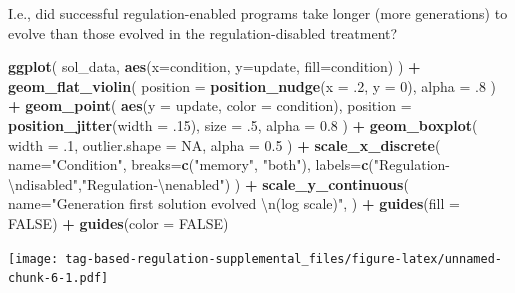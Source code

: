 \documentclass[
]{book}
\newenvironment{Shaded}{\begin{snugshade}}{\end{snugshade}}
\newcommand{\CharTok}[1]{\textcolor[rgb]{0.31,0.60,0.02}{#1}}
\newcommand{\DataTypeTok}[1]{\textcolor[rgb]{0.13,0.29,0.53}{#1}}
\newcommand{\DecValTok}[1]{\textcolor[rgb]{0.00,0.00,0.81}{#1}}
\newcommand{\FloatTok}[1]{\textcolor[rgb]{0.00,0.00,0.81}{#1}}
\newcommand{\KeywordTok}[1]{\textcolor[rgb]{0.13,0.29,0.53}{\textbf{#1}}}
\newcommand{\NormalTok}[1]{#1}
\newcommand{\OperatorTok}[1]{\textcolor[rgb]{0.81,0.36,0.00}{\textbf{#1}}}
\newcommand{\OtherTok}[1]{\textcolor[rgb]{0.56,0.35,0.01}{#1}}
\newcommand{\StringTok}[1]{\textcolor[rgb]{0.31,0.60,0.02}{#1}}
\begin{document}
I.e., did successful regulation-enabled programs take longer (more generations) to evolve than those evolved in the regulation-disabled treatment?

\begin{Shaded}
\begin{Highlighting}[]
\KeywordTok{ggplot}\NormalTok{( sol\_data, }\KeywordTok{aes}\NormalTok{(}\DataTypeTok{x=}\NormalTok{condition, }\DataTypeTok{y=}\NormalTok{update, }\DataTypeTok{fill=}\NormalTok{condition) ) }\OperatorTok{+}
\StringTok{  }\KeywordTok{geom\_flat\_violin}\NormalTok{(}
    \DataTypeTok{position =} \KeywordTok{position\_nudge}\NormalTok{(}\DataTypeTok{x =} \FloatTok{.2}\NormalTok{, }\DataTypeTok{y =} \DecValTok{0}\NormalTok{),}
    \DataTypeTok{alpha =} \FloatTok{.8}
\NormalTok{  ) }\OperatorTok{+}
\StringTok{  }\KeywordTok{geom\_point}\NormalTok{(}
    \KeywordTok{aes}\NormalTok{(}\DataTypeTok{y =}\NormalTok{ update, }\DataTypeTok{color =}\NormalTok{ condition),}
    \DataTypeTok{position =} \KeywordTok{position\_jitter}\NormalTok{(}\DataTypeTok{width =} \FloatTok{.15}\NormalTok{),}
    \DataTypeTok{size =} \FloatTok{.5}\NormalTok{,}
    \DataTypeTok{alpha =} \FloatTok{0.8}
\NormalTok{  ) }\OperatorTok{+}
\StringTok{  }\KeywordTok{geom\_boxplot}\NormalTok{(}
    \DataTypeTok{width =} \FloatTok{.1}\NormalTok{,}
    \DataTypeTok{outlier.shape =} \OtherTok{NA}\NormalTok{,}
    \DataTypeTok{alpha =} \FloatTok{0.5}
\NormalTok{  ) }\OperatorTok{+}
\StringTok{  }\KeywordTok{scale\_x\_discrete}\NormalTok{(}
    \DataTypeTok{name=}\StringTok{"Condition"}\NormalTok{,}
    \DataTypeTok{breaks=}\KeywordTok{c}\NormalTok{(}\StringTok{"memory"}\NormalTok{, }\StringTok{"both"}\NormalTok{),}
    \DataTypeTok{labels=}\KeywordTok{c}\NormalTok{(}\StringTok{"Regulation{-}}\CharTok{\textbackslash{}n}\StringTok{disabled"}\NormalTok{,}\StringTok{"Regulation{-}}\CharTok{\textbackslash{}n}\StringTok{enabled"}\NormalTok{)}
\NormalTok{  ) }\OperatorTok{+}
\StringTok{  }\KeywordTok{scale\_y\_continuous}\NormalTok{(}
    \DataTypeTok{name=}\StringTok{"Generation first solution evolved }\CharTok{\textbackslash{}n}\StringTok{(log scale)"}\NormalTok{,}
\NormalTok{  ) }\OperatorTok{+}
\StringTok{  }\KeywordTok{guides}\NormalTok{(}\DataTypeTok{fill =} \OtherTok{FALSE}\NormalTok{) }\OperatorTok{+}
\StringTok{  }\KeywordTok{guides}\NormalTok{(}\DataTypeTok{color =} \OtherTok{FALSE}\NormalTok{)}
\end{Highlighting}
\end{Shaded}

\texttt{[image: tag-based-regulation-supplemental\_files/figure-latex/unnamed-chunk-6-1.pdf]}
\end{document}
